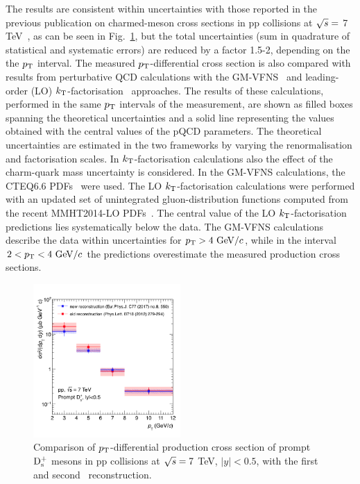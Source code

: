 The results are consistent within uncertainties with 
those reported in the previous publication on charmed-meson 
cross sections in pp collisions at $\sqrt{s}=$ 7 TeV~\cite{ALICE:2011aa,Abelev:2012tca},
as can be seen in Fig.~\ref{fig:comparisonPass2Pass4}, 
but the total uncertainties (sum in quadrature of statistical and systematic
errors) are reduced by a factor 1.5-2, depending on the the $p_{\rm T}$ interval.
The measured $p_{\rm T}$-differential cross section is also compared with results from 
perturbative QCD calculations with the GM-VFNS~\cite{Kniehl:2004fy,Kniehl:2005mk,Kniehl:2012ti}
and leading-order (LO) $k_{\rm T}$-factorisation~\cite{Maciula:2013wg} approaches.
The results of these calculations, performed in the same $p_{\rm T}$ intervals of the 
measurement, are shown as filled boxes spanning the theoretical uncertainties
and a solid line representing the values obtained with the central values of 
the pQCD parameters.
The theoretical uncertainties are estimated in the two frameworks
by varying the renormalisation and factorisation scales. 
In $k_{\rm T}$-factorisation calculations also the effect of the 
charm-quark mass uncertainty is considered.
In the GM-VFNS calculations, the CTEQ6.6 PDFs~\cite{Pumplin:2002vw}
were used. The LO $k_{\rm T}$-factorisation calculations were performed
with an updated set of unintegrated gluon-distribution functions computed 
from the recent MMHT2014-LO PDFs~\cite{Harland-Lang:2014zoa}.
The central value of the LO $k_{\rm T}$-factorisation predictions lies systematically 
below the data.
The GM-VFNS calculations describe the data within 
uncertainties for $p_{\rm T}>4~\mathrm{GeV}/c$, while in the interval
$2<p_{\rm T}<4~\mathrm{GeV}/c$ the predictions overestimate the measured production
cross sections.\\

\begin{figure}[!htb]
\begin{center}
\includegraphics[width=0.5\textwidth]{FigCap4/CrossSec_pass4_publPass2.png}
\caption{Comparison of $p_{\rm T}$-differential production cross section of prompt ${\rm D_s^+}$ mesons 
in pp collisions at $\sqrt{s} = 7 $ TeV, $|y|<0.5$, with the first~\cite{Abelev:2012tca} and second~\cite{Acharya:2017jgo} reconstruction.}
\label{fig:comparisonPass2Pass4}
\end{center}
\end{figure}

